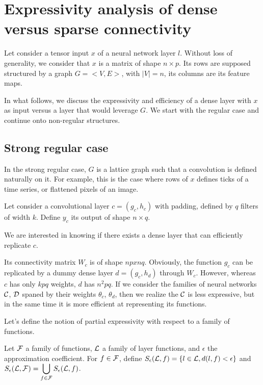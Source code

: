 

\section{Expressivity analysis of dense versus sparse connectivity}

Let consider a tensor input $x$ of a neural network layer $l$. Without loss of generality, we consider that $x$ is a matrix of shape $n \times p$. Its rows are supposed structured by a graph $G = <V, E>$, with $|V| = n$, its columns are its feature maps.

In what follows, we discuss the expressivity and efficiency of a dense layer with $x$ as input versus a layer that would leverage $G$. We start with the regular case and continue onto non-regular structures.

\subsection{Strong regular case}

In the strong regular case, $G$ is a lattice graph such that a convolution is defined naturally on it. For example, this is the case where rows of $x$ defines ticks of a time series, or flattened pixels of an image.

Let consider a convolutional layer $c = (g_c,h_c)$ with padding, defined by $q$ filters of width $k$. Define $y_c$ its output of shape $n \times q$.

We are interested in knowing if there exists a dense layer that can efficiently replicate $c$.

Its connectivity matrix $W_c$ is of shape $np x nq$. Obviously, the function $g_c$ can be replicated by a dummy dense layer $d = (g_c,h_d)$ through $W_c$. However, whereas $c$ has only $kpq$ weights, $d$ has $n^2pq$. If we consider the families of neural networks $\mathcal{C}$, $\mathcal{D}$ spaned by their weights $\theta_c$, $\theta_d$, then we realize the $\mathcal{C}$ is less expressive, but in the same time it is more efficient at representing its functions.

Let's define the notion of partial expressivity with respect to a family of functions.

Let $\mathcal{F}$ a family of functions, $\mathcal{L}$ a family of layer functions, and $\epsilon$ the approximation coefficient. For $f \in \mathcal{F}$, define $S_{\epsilon}(\mathcal{L},f) = \{l \in \mathcal{L}, d(l,f) < \epsilon \}$ and $S_{\epsilon}(\mathcal{L},\mathcal{F}) = \displaystyle \bigcup_{f \in \mathcal{F}} S_{\epsilon}(\mathcal{L},f)$.

